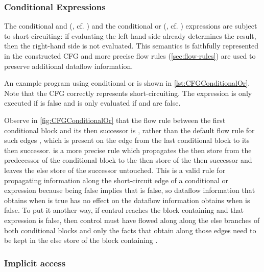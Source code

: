 
\subsubsection{Conditional Expressions}
\label{sec:cond-exp}

The conditional and (\code{&&}, cf. ) and the conditional
or (\code{||}, cf. ) expressions are subject to short-circuiting:
if evaluating the left-hand side already determines the result, then the right-hand
side is not evaluated. This semantics is faithfully represented in the constructed CFG and
more precise flow rules (\autoref{sec:flow-rules}) are used to preserve additional dataflow
information.

An example program using conditional or is shown in \autoref{lst:CFGConditionalOr}.
Note that the CFG correctly represents short-circuiting.  The expression  is
only executed if  is false and  is only evaluated if  and 
are false.

Observe in \autoref{fig:CFGConditionalOr} that the flow rule between the first conditional block and its then successor is , rather than the default flow rule for such edges , which is present on the edge from the last conditional block to its then successor.   is a more precise rule which propagates the then store from the predecessor of the conditional block to the then store of the then successor and leaves the else store of the successor untouched.  This is a valid rule for propagating information along the short-circuit edge of a conditional or expression because  being false implies that  is false, so dataflow information that obtains when  is true has no effect on the dataflow information obtains when  is false.  To put it another way, if control reaches the block containing  and that expression is false, then control must have flowed along along the else branches of both conditional blocks and only the facts that obtain along those edges need to be kept in the else store of the block containing .



\subsubsection{Implicit  access}

